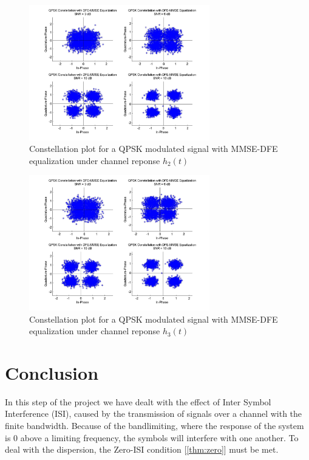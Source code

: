\documentclass[]{article}
\begin{document}
\begin{figure}[H]
\centering
\includegraphics[width=0.7\textwidth]{qpConstDFEMMSE2.jpg}
\caption{Constellation plot for a QPSK modulated signal with MMSE-DFE equalization under channel reponse $h_2(t)$}
\end{figure}

\begin{figure}[H]
\centering
\includegraphics[width=0.7\textwidth]{qpConstDFEMMSE3.jpg}
\caption{Constellation plot for a QPSK modulated signal with MMSE-DFE equalization under channel reponse $h_3(t)$}
\end{figure}


\newpage
\section{Conclusion}
\label{sec:conc}

In this step of the project we have dealt with the effect of Inter Symbol Interference (ISI), caused by the transmission of signals over a channel with the finite bandwidth. Because of the bandlimiting, where the response of the system is 0 above a limiting frequency, the symbols will interfere with one another. To deal with the dispersion, the Zero-ISI condition [\ref{thm:zero}] must be met. 
\end{document}
